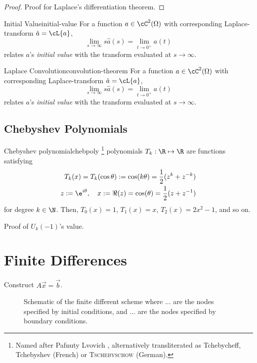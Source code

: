\documentclass{prettytex/ox/mmsc-special-topic}
\begin{document}
  \begin{proof}
    Proof for Laplace's differentiation theorem.
  \end{proof}

  \begin{theorem}{Initial Value}{initial-value}
    For a function $a \in \cC^2(\Omega)$ with corresponding Laplace-transform $\hat{a} = \cL\{a\}$,
    $$\lim_{s \rightarrow \infty} s \hat{a}(s) = \lim_{t \rightarrow 0^+} a(t)$$
    relates $a$'s \textit{initial value} with the transform evaluated at $s \rightarrow \infty$.
  \end{theorem}

  \begin{theorem}{Laplace Convolution}{convolution-theorem}
    For a function $a \in \cC^2(\Omega)$ with corresponding Laplace-transform $\hat{a} = \cL\{a\}$,
    $$\lim_{s \rightarrow \infty} s \hat{a}(s) = \lim_{t \rightarrow 0^+} a(t)$$
    relates $a$'s \textit{initial value} with the transform evaluated at $s \rightarrow \infty$.
  \end{theorem}

  \subsection{Chebyshev Polynomials}
  \begin{definition}{Chebyshev polynomial}{chebpoly}
    \chebyshev\footnote{Named after Pafnuty Lvovich \chebyshev, alternatively transliterated as Tchebycheff, Tchebyshev (French) or \textsc{Tschebyschow} (German).} polynomials $T_k: \R \mapsto \R$ are functions satisfying
    \begin{align*}
      T_k(x) = T_k(\cos \theta) := \cos(k \theta) = \frac{1}{2} (z^k + z^{-k}) \\
      z := \e^{i \theta},\quad x := \Re(z) = \cos(\theta) = \frac{1}{2}(z + z^{-1})
    \end{align*}
    for degree $k \in \N$. Then, $T_0(x) = 1$, $T_1(x) = x$, $T_2(x) = 2x^2-1$, and so on.
  \end{definition}

  Proof of $U_k(-1)$'s value.

  \section{Finite Differences}
  Construct $A \vec{x} = \vec{b}$.

  \begin{figure}[H]
    \centering
    \caption{Schematic of the finite different scheme where ... are the nodes specified by initial conditions, and ... are the nodes specified by boundary conditions.}
    \label{fig:fd-scheme}
  \end{figure}
\end{document}
